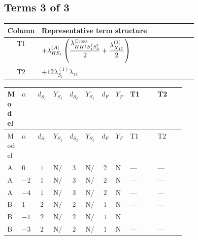 \documentclass[8pt]{article}
\begin{document}
\begin{landscape}
\subsection*{Terms 3 of 3}
\begin{center}
\begin{tabular}{@{}c >{\raggedright\arraybackslash}p{0.82\linewidth}@{}}
\toprule
Column & Representative term structure \\
\midrule
T1 & \(\displaystyle +{\lambda_{HS_1}^{(A)}} \left(\frac{{\lambda_{H H^\dagger S_1^\dagger S_2^\dagger}^{\rm Cross}}}{2}+\frac{{\lambda_{X_{17}}^{(1)}}}{2}\right)\) \\
\midrule
T2 & \(\displaystyle +12 {\lambda_{S_1}^{(1)}} {\lambda_{11}}\) \\
\midrule
\bottomrule
\end{tabular}
\end{center}
\smallskip
\tiny
\begin{longtable}{@{}llcccccc >{\raggedright\arraybackslash}p{0.21\linewidth} >{\raggedright\arraybackslash}p{0.21\linewidth}@{}}
\toprule
Model & $\alpha$ & $d_{S_1}$ & $Y_{S_1}$ & $d_{S_2}$ & $Y_{S_2}$ & $d_F$ & $Y_F$ & T1 & T2 \\
\midrule
\endfirsthead
\toprule
Model & $\alpha$ & $d_{S_1}$ & $Y_{S_1}$ & $d_{S_2}$ & $Y_{S_2}$ & $d_F$ & $Y_F$ & T1 & T2 \\
\midrule
\endhead
A & $0$ & $1$ & $\text{N/A}$ & $3$ & $\text{N/A}$ & $2$ & $\text{N/A}$ & --- & --- \\
\midrule
A & $-2$ & $1$ & $\text{N/A}$ & $3$ & $\text{N/A}$ & $2$ & $\text{N/A}$ & --- & --- \\
\midrule
A & $-4$ & $1$ & $\text{N/A}$ & $3$ & $\text{N/A}$ & $2$ & $\text{N/A}$ & --- & --- \\
\midrule
B & $1$ & $2$ & $\text{N/A}$ & $2$ & $\text{N/A}$ & $1$ & $\text{N/A}$ & --- & --- \\
\midrule
B & $-1$ & $2$ & $\text{N/A}$ & $2$ & $\text{N/A}$ & $1$ & $\text{N/A}$ & \scriptsize\adjustbox{max width=\linewidth}{$\begin{gathered} +{\lambda_{HS_1}^{(A)}} \left(\frac{{\lambda_{H H^\dagger S_1^\dagger S_2^\dagger}^{\rm Cross}}}{2}+\frac{{\lambda_{X_{17}}^{(1)}}}{2}\right)\end{gathered}$} & \scriptsize\adjustbox{max width=\linewidth}{$\begin{gathered} +12 {\lambda_{S_1}^{(1)}} {\lambda_{11}}\end{gathered}$} \\
\midrule
B & $-3$ & $2$ & $\text{N/A}$ & $2$ & $\text{N/A}$ & $1$ & $\text{N/A}$ & --- & --- \\

\end{longtable}
\end{landscape}
\end{document}
